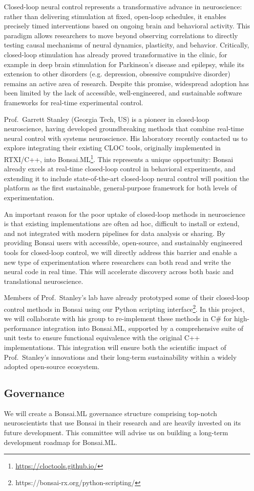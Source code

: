 Closed-loop neural control represents a transformative advance in neuroscience:  
rather than delivering stimulation at fixed, open-loop schedules, it enables  
precisely timed interventions based on ongoing brain and behavioral activity.  
This paradigm allows researchers to move beyond observing correlations to  
directly testing causal mechanisms of neural dynamics, plasticity, and
behavior.  
Critically, closed-loop stimulation has already proved transformative in the  
clinic, for example in deep brain stimulation for Parkinson’s disease and  
epilepsy, while its extension to other disorders (e.g. depression, obsessive  
compulsive disorder) remains an active area of research. Despite this promise,  
widespread adoption has been limited by the lack of accessible,
well-engineered,  
and sustainable software frameworks for real-time experimental control.

Prof.~Garrett Stanley (Georgia Tech, US) is a pioneer in closed-loop  
neuroscience, having developed groundbreaking methods that combine real-time  
neural control with systems neuroscience. His laboratory recently contacted us  
to explore integrating their existing CLOC tools, originally implemented in  
RTXI/C++, into Bonsai.ML\footnote[6]{\url{https://cloctools.github.io/}}.  
This represents a unique opportunity: Bonsai already excels at real-time  
closed-loop control in behavioral experiments, and extending it to include  
state-of-the-art closed-loop neural control will position the platform as the  
first sustainable, general-purpose framework for both levels of
experimentation.

An important reason for the poor uptake of closed-loop methods in neuroscience  
is that existing implementations are often ad hoc, difficult to install or  
extend, and not integrated with modern pipelines for data analysis or  
sharing. By providing Bonsai users with accessible, open-source, and  
sustainably engineered tools for closed-loop control, we will directly address  
this barrier and enable a new type of experimentation where researchers can  
both read and write the neural code in real time. This will accelerate  
discovery across both basic and translational neuroscience.

Members of Prof.~Stanley’s lab have already prototyped some of their  
closed-loop control methods in Bonsai using our Python scripting
interface\footnote{https://bonsai-rx.org/python-scripting/}.  
In this project, we will collaborate with his group to re-implement these  
methods in C\# for high-performance integration into Bonsai.ML, supported by a  
comprehensive suite of unit tests to ensure functional equivalence with the  
original C++ implementations. This integration will ensure both the scientific  
impact of Prof.~Stanley’s innovations and their long-term sustainability within  
a widely adopted open-source ecosystem.

\subsection*{Governance}

We will create a Bonsai.ML governance structure comprising top-notch
neuroscientists that use Bonsai in their research and are heavily invested on
its future development.
%
This committee will advise us on building a long-term development roadmap for
Bonsai.ML.
